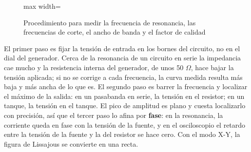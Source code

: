 \documentclass[11pt,letterpaper]{article}
\begin{document}
\begin{figure}[H]
  \centering
  \begin{adjustbox}{max width=\linewidth}
  \end{adjustbox}
  \caption{Procedimiento para medir la frecuencia de resonancia, las frecuencias de corte, el ancho de banda y el factor de calidad}
\end{figure}

El primer paso es fijar la tensión de entrada en los bornes del circuito, no en el dial del generador. Cerca de la resonancia de un circuito en serie la impedancia cae mucho y la resistencia interna del generador, de unos 50 \ensuremath{\Omega}, hace bajar la tensión aplicada; si no se corrige a cada frecuencia, la curva medida resulta más baja y más ancha de lo que es. El segundo paso es barrer la frecuencia y localizar el máximo de la salida: en un pasabanda en serie, la tensión en el resistor; en un tanque, la tensión en el tanque. El pico de amplitud es plano y cuesta localizarlo con precisión, así que el tercer paso lo afina por \textbf{fase}: en la resonancia, la corriente queda en fase con la tensión de la fuente, y en el osciloscopio el retardo entre la tensión de la fuente y la del resistor se hace cero. Con el modo X-Y, la figura de Lissajous se convierte en una recta.
\end{document}
